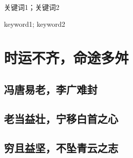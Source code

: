 \documentclass{QHUthesis}
\begin{document}
	
\renewcommand{\title}{Design of production line for physical recycling and separation of waste photovoltaic modules} %
\renewcommand{\biaoti}{废旧光伏组件物理回收分离装备产线设计}  %
\renewcommand{\xueyuan}{机械工程学院}
\renewcommand{\zhuanye}{机械电子工程}
\renewcommand{\xingming}{coffeelize}
\renewcommand{\xuehao}{1700417035}
\renewcommand{\grade}{2017级}
\renewcommand{\daoshi}{Coffeelize}
\renewcommand{\dateOfGrant}{2021年5月20日}
\renewcommand{\class}{本科生毕业论文} %

\titlepage
\thispagestyle{empty} 
\statement
\clearpage
\clearpage
\thispagestyle{empty} 
\tableofcontents
\thispagestyle {empty}

\frontmatter

\mainmatter %
\songti{} %

\begin{zhAbsract}{关键词1；关键词2}
	\zhlipsum[1]
\end{zhAbsract}
\begin{enAbsract}{keyword1; keyword2}
	\lipsum[1]
\end{enAbsract}


\chapter{时运不齐，命途多舛}
\section{冯唐易老，李广难封}
\zhlipsum[1-3]
\section{老当益壮，宁移白首之心}
\zhlipsum[1-5]

\begin{figure}[htbp]
	\centering
	\label{fig:1}
\end{figure}

\section{穷且益坚，不坠青云之志}
\end{document}
